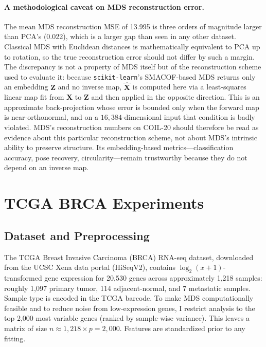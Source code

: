 \documentclass[11pt]{article}
\begin{document}
\paragraph{A methodological caveat on MDS reconstruction error.} The mean MDS reconstruction MSE of 13.995 is three orders of magnitude larger than PCA's (0.022), which is a larger gap than seen in any other dataset. Classical MDS with Euclidean distances is mathematically equivalent to PCA up to rotation, so the true reconstruction error should not differ by such a margin. The discrepancy is not a property of MDS itself but of the reconstruction scheme used to evaluate it: because \texttt{scikit-learn}'s SMACOF-based MDS returns only an embedding $\mathbf{Z}$ and no inverse map, $\widehat{\mathbf{X}}$ is computed here via a least-squares linear map fit from $\mathbf{X}$ to $\mathbf{Z}$ and then applied in the opposite direction. This is an approximate back-projection whose error is bounded only when the forward map is near-orthonormal, and on a $16{,}384$-dimensional input that condition is badly violated. MDS's reconstruction numbers on COIL-20 should therefore be read as evidence about this particular reconstruction scheme, not about MDS's intrinsic ability to preserve structure. Its embedding-based metrics---classification accuracy, pose recovery, circularity---remain trustworthy because they do not depend on an inverse map.

\section{TCGA BRCA Experiments}
\label{sec:tcga}

\subsection{Dataset and Preprocessing}

The TCGA Breast Invasive Carcinoma (BRCA) RNA-seq dataset, downloaded from the UCSC Xena data portal (HiSeqV2), contains $\log_2(x+1)$-transformed gene expression for 20{,}530 genes across approximately 1{,}218 samples: roughly 1{,}097 primary tumor, 114 adjacent-normal, and 7 metastatic samples. Sample type is encoded in the TCGA barcode. To make MDS computationally feasible and to reduce noise from low-expression genes, I restrict analysis to the top 2{,}000 most variable genes (ranked by sample-wise variance). This leaves a matrix of size $n \approx 1{,}218 \times p = 2{,}000$. Features are standardized prior to any fitting.
\end{document}
